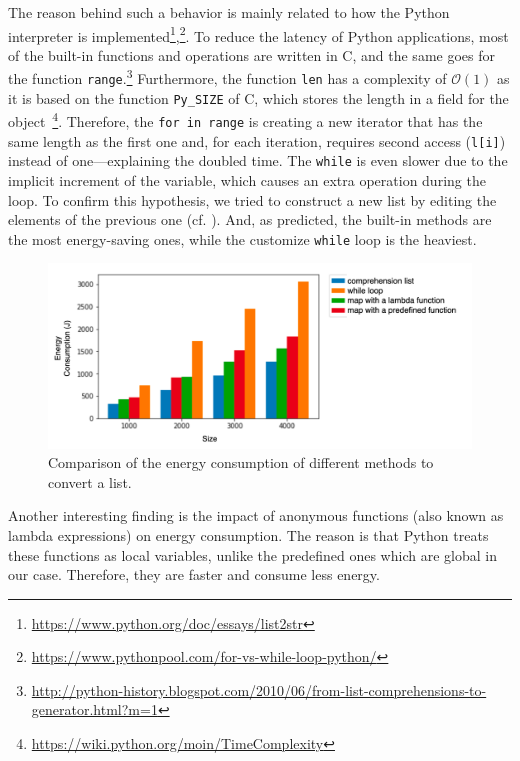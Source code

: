 The reason behind such a behavior is mainly related to how the Python interpreter is implemented\footnote{\url{https://www.python.org/doc/essays/list2str}},\footnote{\url{https://www.pythonpool.com/for-vs-while-loop-python/}}.  
To reduce the latency of Python applications, most of the built-in functions and operations are written in C, and the same goes for the function \texttt{range}.\footnote{\url{ http://python-history.blogspot.com/2010/06/from-list-comprehensions-to-generator.html?m=1}}
Furthermore, the function \texttt{len} has a complexity of $\mathcal{O}(1)$ as it is based on the function \texttt{Py\_SIZE} of C, which stores the length in a field for the object~\footnote{\url{https://wiki.python.org/moin/TimeComplexity}}.
Therefore, the \texttt{for in range} is creating a new iterator that has the same length as the first one and, for each iteration, requires second access (\texttt{l[i]}) instead of one---explaining the doubled time.
The \texttt{while} is even slower due to the implicit increment of the variable, which causes an extra operation during the loop.
To confirm this hypothesis, we tried to construct a new list by editing the elements of the previous one (cf. ).
And, as predicted, the built-in methods are the most energy-saving ones, while the customize \texttt{while} loop is the heaviest.

\begin{figure}
    \centering
    \includegraphics[width=\linewidth]{imgs/python_treatemens}
    \caption{Comparison of the energy consumption of different methods to convert a list.}
    \label{fig:pythontreatement}
\end{figure}

Another interesting finding is the impact of anonymous functions (also known as lambda expressions) on energy consumption.
The reason is that Python treats these functions as local variables, unlike the predefined ones which are global in our case.
Therefore, they are faster and consume less energy.  %


